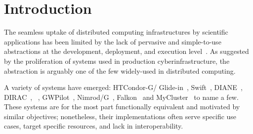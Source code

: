 \documentclass{sig-alternate}
\begin{document}
\begin{abstract}
\end{abstract}

\section{Introduction}
\label{sec:intro}


The seamless uptake of distributed computing infrastructures by scientific
applications has been limited by the lack of pervasive and simple-to-use
abstractions at the development, deployment, and execution
level~\cite{dpa_surveypaper,dpagrid2009}.  As suggested by the proliferation of
\pilotjob systems used in production cyberinfrastructure, the \pilotjob
abstraction is arguably one of the few widely-used in distributed computing.

A variety of \pilotjob systems have emerged: HTCondor-G/
Glide-in~\cite{frey2002condorG}, Swift~\cite{wilde2011swift},
DIANE~\cite{moscicki2003diane}, DIRAC~\cite{casajus2010dirac},
\panda~\cite{chiu2010pilot}, GWPilot~\cite{rubio2015gwpilot},
Nimrod/G~\cite{buyya2000nimrod}, Falkon~\cite{raicu2007} and
MyCluster~\cite{walker2006creating,walker2007personal} to name a few. These
systems are for the most part functionally equivalent and motivated by similar
objectives; nonetheless, their implementations often serve specific use cases,
target specific resources, and lack in interoperability.
\end{document}

